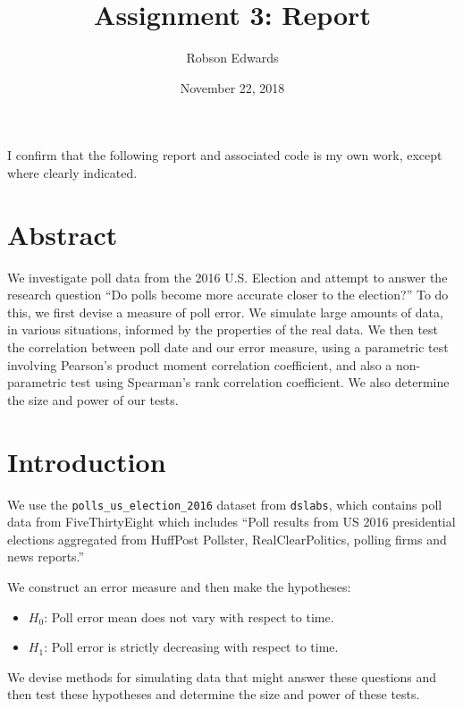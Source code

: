 \documentclass[11pt, oneside]{article}
\title{Assignment 3: Report}
\author{Robson Edwards}
\date{November 22, 2018}
\newcommand \Rcode[1]{{\texttt{\colorbox{codegray}{#1}}}}
\begin{document}
\maketitle

I confirm that the following report and associated code is my own work, except where clearly indicated.


\section*{Abstract}

We investigate poll data from the 2016 U.S. Election and attempt to answer the research question ``Do polls become more accurate closer to the election?'' 
To do this, we first devise a measure of poll error. 
We simulate large amounts of data, in various situations, informed by the properties of the real data. 
We then test the correlation between poll date and our error measure, using a parametric test involving Pearson's product moment correlation coefficient, and also a non-parametric test using Spearman's rank correlation coefficient. \cite{R}
We also determine the size and power of our tests. 

\section{Introduction}

We use the \Rcode{polls\_us\_election\_2016} dataset from \Rcode{dslabs}, which contains poll data from FiveThirtyEight which includes ``Poll results from US 2016 presidential elections aggregated from HuffPost Pollster, RealClearPolitics, polling firms and news reports.'' \cite{dslabs} 

We construct an error measure and then make the hypotheses:

\begin{itemize}
\item $H_0$: Poll error mean does not vary with respect to time.

\item $H_1$: Poll error is strictly decreasing with respect to time. 
\end{itemize}

We devise methods for simulating data that might answer these questions and then test these hypotheses and determine the size and power of these tests. 
\end{document}
